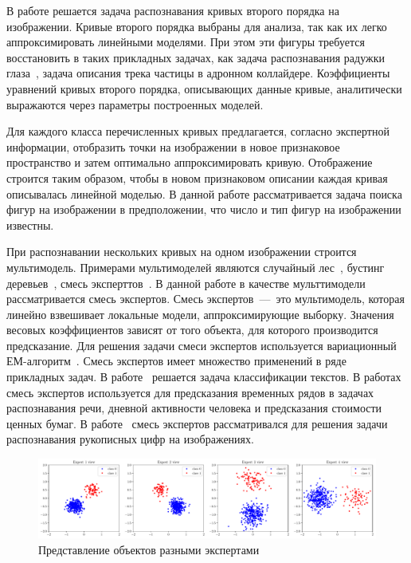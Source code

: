 \documentclass[12pt, twoside]{article}
\numberwithin{equation}{section}
\begin{document}
В работе решается задача распознавания кривых второго порядка на изображении. Кривые второго порядка выбраны для анализа, так как их легко аппроксимировать линейными моделями. При этом эти фигуры требуется восстановить в таких прикладных задачах, как задача распознавания радужки глаза~\cite{Matveev2010, Matveev2014, Bowyer2010}, задача описания трека частицы в адронном коллайдере. Коэффициенты уравнений кривых второго порядка, описывающих данные кривые, аналитически выражаются через параметры построенных моделей.

Для каждого класса перечисленных кривых предлагается, согласно экспертной информации, отобразить точки на изображении в новое признаковое пространство и затем оптимально аппроксимировать кривую. Отображение строится таким образом, чтобы в новом признаковом описании каждая кривая описывалась линейной моделью. В данной работе рассматривается задача поиска фигур на изображении в предположении, что число и тип фигур на изображении известны.

При распознавании нескольких кривых на одном изображении строится мультимодель. Примерами мультимоделей являются случайный лес~\cite{Ishwaran2012}, бустинг деревьев~\cite{Tianqi2016}, смесь эксперттов~\cite{Yuksel2012}. В данной работе в качестве мульттимодели рассматривается смесь экспертов. Смесь экспертов~---~это мультимодель, которая линейно взвешивает локальные модели, аппроксимирующие выборку. Значения весовых коэффициентов зависят от того объекта, для которого производится предсказание. Для решения задачи смеси экспертов используется вариационный ЕМ-алгоритм~\cite{Dempster1977, bishop2006, Peng1996}. Смесь экспертов имеет множество применений в ряде прикладных задач. В работе~\cite{Estabrooks2001} решается задача классификации текстов. В работах~\cite{Cheung1995, Weigend2000, Cao2003, Mossavat2010, Sminchisescu2007, Tuerk2001, Yumlu2003} смесь экспертов используется для предсказания временных рядов в задачах распознавания речи, дневной активности человека и предсказания стоимости ценных бумаг. В работе~\cite{Ebrahimpour2009} смесь экспертов рассматривался для решения задачи распознавания рукописных цифр на изображениях.

\begin{figure}[h!t]\center
\includegraphics[width=1.0\textwidth]{figures/expert_example}
\caption{Представление объектов разными экспертами}
\label{intro:fig1}
\end{figure}
\end{document}
